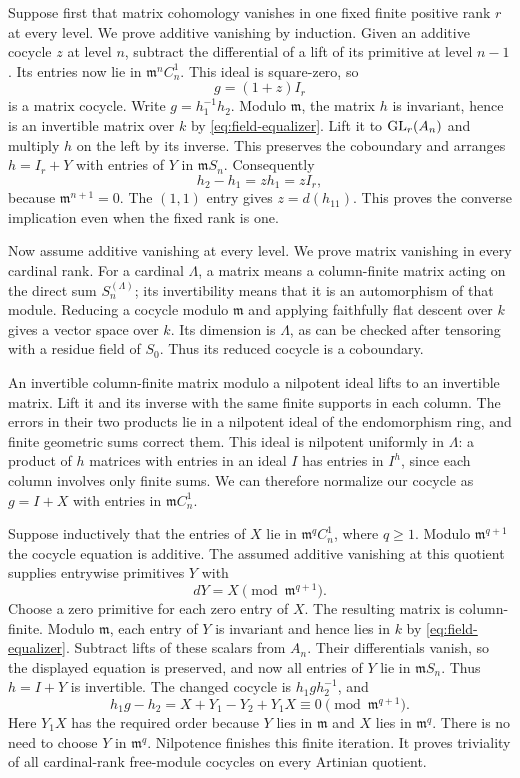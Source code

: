 Suppose first that matrix cohomology vanishes in one fixed finite positive rank $r$ at every level. We prove additive vanishing by induction. Given an additive cocycle $z$ at level $n$, subtract the differential of a lift of its primitive at level $n-1$. Its entries now lie in $\mathfrak m^n C_n^1$. This ideal is square-zero, so
\[
 g=(1+z)I_r
\]
is a matrix cocycle. Write $g=h_1^{-1}h_2$. Modulo $\mathfrak m$, the matrix $h$ is invariant, hence is an invertible matrix over $k$ by \eqref{eq:field-equalizer}. Lift it to $\operatorname{GL}_r(A_n)$ and multiply $h$ on the left by its inverse. This preserves the coboundary and arranges $h=I_r+Y$ with entries of $Y$ in $\mathfrak mS_n$. Consequently
\[
 h_2-h_1=z h_1=zI_r,
\]
because $\mathfrak m^{n+1}=0$. The $(1,1)$ entry gives $z=d(h_{11})$. This proves the converse implication even when the fixed rank is one.

Now assume additive vanishing at every level. We prove matrix vanishing in every cardinal rank. For a cardinal $\Lambda$, a matrix means a column-finite matrix acting on the direct sum $S_n^{(\Lambda)}$; its invertibility means that it is an automorphism of that module. Reducing a cocycle modulo $\mathfrak m$ and applying faithfully flat descent over $k$ gives a vector space over $k$. Its dimension is $\Lambda$, as can be checked after tensoring with a residue field of $S_0$. Thus its reduced cocycle is a coboundary.

An invertible column-finite matrix modulo a nilpotent ideal lifts to an invertible matrix. Lift it and its inverse with the same finite supports in each column. The errors in their two products lie in a nilpotent ideal of the endomorphism ring, and finite geometric sums correct them. This ideal is nilpotent uniformly in $\Lambda$: a product of $h$ matrices with entries in an ideal $I$ has entries in $I^h$, since each column involves only finite sums. We can therefore normalize our cocycle as $g=I+X$ with entries in $\mathfrak m C_n^1$.

Suppose inductively that the entries of $X$ lie in $\mathfrak m^q C_n^1$, where $q\geq1$. Modulo $\mathfrak m^{q+1}$ the cocycle equation is additive. The assumed additive vanishing at this quotient supplies entrywise primitives $Y$ with
\[
 dY=X\pmod{\mathfrak m^{q+1}}.
\]
Choose a zero primitive for each zero entry of $X$. The resulting matrix is column-finite. Modulo $\mathfrak m$, each entry of $Y$ is invariant and hence lies in $k$ by \eqref{eq:field-equalizer}. Subtract lifts of these scalars from $A_n$. Their differentials vanish, so the displayed equation is preserved, and now all entries of $Y$ lie in $\mathfrak mS_n$. Thus $h=I+Y$ is invertible. The changed cocycle is $h_1gh_2^{-1}$, and
\[
 h_1g-h_2=X+Y_1-Y_2+Y_1X
             \equiv0\pmod{\mathfrak m^{q+1}}.
\]
Here $Y_1X$ has the required order because $Y$ lies in $\mathfrak m$ and $X$ lies in $\mathfrak m^q$. There is no need to choose $Y$ in $\mathfrak m^q$. Nilpotence finishes this finite iteration. It proves triviality of all cardinal-rank free-module cocycles on every Artinian quotient.

